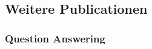\documentclass[a4paper,11pt]{article}
\begin{document}

\subsection*{Weitere Publicationen}

\subsubsection*{Question Answering}
\end{document}
